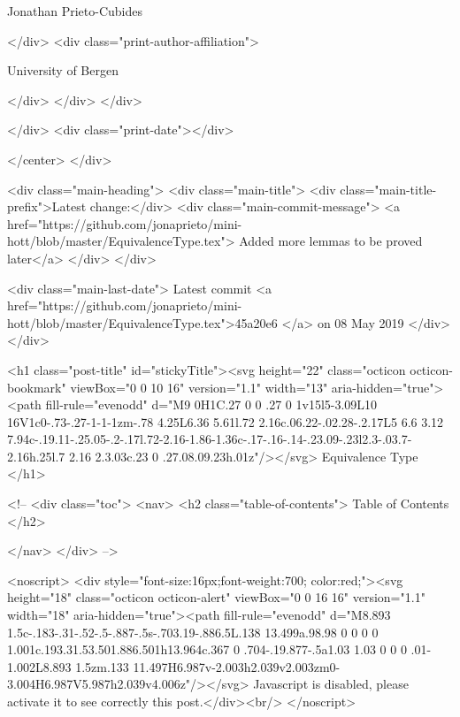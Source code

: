                  Jonathan Prieto-Cubides
                
              </div>
              <div class="print-author-affiliation">
                
                  University of Bergen
                
                </div>
            </div>
          </div>
          
          
        </div>
        <div class="print-date"></div>
        
        
    </center>
  </div>

  
  <div class="main-heading">
    <div class="main-title">
      <div class="main-title-prefix">Latest change:</div>
      <div class="main-commit-message">
            <a href="https://github.com/jonaprieto/mini-hott/blob/master/EquivalenceType.tex">
              Added more lemmas to be proved later</a>
      </div>
    </div>

    <div class="main-last-date">
      Latest commit <a href="https://github.com/jonaprieto/mini-hott/blob/master/EquivalenceType.tex">45a20e6 </a> on  08 May 2019
    </div>
  </div>
  
  <h1 class="post-title" id="stickyTitle"><svg height="22" class="octicon octicon-bookmark" viewBox="0 0 10 16" version="1.1" width="13" aria-hidden="true"><path fill-rule="evenodd" d="M9 0H1C.27 0 0 .27 0 1v15l5-3.09L10 16V1c0-.73-.27-1-1-1zm-.78 4.25L6.36 5.61l.72 2.16c.06.22-.02.28-.2.17L5 6.6 3.12 7.94c-.19.11-.25.05-.2-.17l.72-2.16-1.86-1.36c-.17-.16-.14-.23.09-.23l2.3-.03.7-2.16h.25l.7 2.16 2.3.03c.23 0 .27.08.09.23h.01z"/></svg> Equivalence Type
  </h1>

  <!-- 
  <div class="toc">
    <nav>
    <h2 class="table-of-contents"> Table of Contents </h2>
      

    </nav>
  </div>
   -->

  <noscript>
  <div style="font-size:16px;font-weight:700; color:red;"><svg height="18" class="octicon octicon-alert" viewBox="0 0 16 16" version="1.1" width="18" aria-hidden="true"><path fill-rule="evenodd" d="M8.893 1.5c-.183-.31-.52-.5-.887-.5s-.703.19-.886.5L.138 13.499a.98.98 0 0 0 0 1.001c.193.31.53.501.886.501h13.964c.367 0 .704-.19.877-.5a1.03 1.03 0 0 0 .01-1.002L8.893 1.5zm.133 11.497H6.987v-2.003h2.039v2.003zm0-3.004H6.987V5.987h2.039v4.006z"/></svg> Javascript is disabled, please activate it to see correctly this post.</div><br/>
  </noscript>

